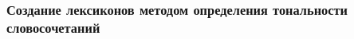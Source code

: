     \lstset{style=python}
    


    \subsubsection{Создание лексиконов методом определения тональности словосочетаний}
